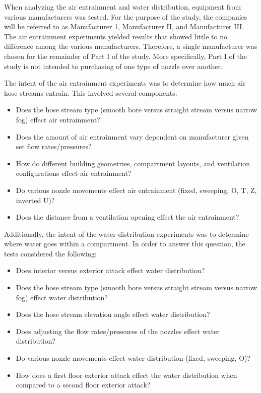 \documentclass{article}
\begin{document}
When analyzing the air entrainment and water distribution, equipment from various manufacturers was tested. For the purpose of the study, the companies will be referred to as Manufacturer 1, Manufacturer II, and Manufacturer III. The air entrainment experiments yielded results that showed little to no difference among the various manufacturers. Therefore, a single manufacturer was chosen for the remainder of Part I of the study. More specifically, Part I of the study is not intended to purchasing of one type of nozzle over another.

The intent of the air entrainment experiments was to determine how much air hose streams entrain. This involved several components:

\begin{itemize}
	\item Does the hose stream type (smooth bore versus straight stream versus narrow fog) effect air entrainment?
	\item Does the amount of air entrainment vary dependent on manufacturer given set flow rates/pressures?
	\item How do different building geometries, compartment layouts, and ventilation configurations effect air entrainment?
	\item Do various nozzle movements effect air entrainment (fixed, sweeping, O, T, Z, inverted U)?
	\item Does the distance from a ventilation opening effect the air entrainment?

\end{itemize}

Additionally, the intent of the water distribution experiments was to determine where water goes within a compartment. In order to answer this question, the tests considered the following:

\begin{itemize}
	\item Does interior versus exterior attack effect water distribution?
	\item Does the hose stream type (smooth bore versus straight stream versus narrow fog) effect water distribution? 
	\item Does the hose stream elevation angle effect water distribution?
	\item Does adjusting the flow rates/pressures of the nozzles effect water distribution? 
	\item Do various nozzle movements effect water distribution (fixed, sweeping, O)?
	\item How does a first floor exterior attack effect the water distribution when compared to a second floor exterior attack?
\end{itemize}
\end{document}
